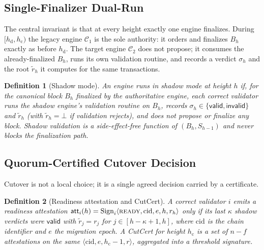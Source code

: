 \documentclass[journal]{IEEEtran}
\newtheorem{definition}{Definition}
\begin{document}
\subsection{Single-Finalizer Dual-Run}
The central invariant is that at every height exactly one engine finalizes. During
$[h_{\mathrm{d}}, h_{\mathrm{c}})$ the legacy engine $\mathcal{C}_1$ is the sole authority: it
orders and finalizes $B_h$ exactly as before $h_{\mathrm{d}}$. The target engine
$\mathcal{C}_2$ does not propose; it consumes the already-finalized $B_h$, runs its own
validation routine, and records a verdict $\sigma_h$ and the root $\tilde r_h$ it computes for
the same transactions.

\begin{definition}[Shadow mode]
\label{def:shadow}
An engine runs in shadow mode at height $h$ if, for the canonical block $B_h$ finalized by the
authoritative engine, each correct validator runs the shadow engine's validation routine on
$B_h$, records $\sigma_h \in \{\mathsf{valid},\mathsf{invalid}\}$ and $\tilde r_h$ (with
$\tilde r_h=\bot$ if validation rejects), and does not propose or finalize any block. Shadow
validation is a side-effect-free function of $(B_h,S_{h-1})$ and never blocks the finalization
path.
\end{definition}

\subsection{Quorum-Certified Cutover Decision}
Cutover is not a local choice; it is a single agreed decision carried by a certificate.

\begin{definition}[Readiness attestation and CutCert]
\label{def:cutcert}
A correct validator $i$ emits a readiness attestation $\mathsf{att}_i(h) = \mathrm{Sign}_i
\langle \textsc{ready}, \mathrm{cid}, e, h, r_h\rangle$ only if its last $\kappa$ shadow
verdicts were $\mathsf{valid}$ with $\tilde r_j = r_j$ for $j\in[h-\kappa+1,h]$, where
$\mathrm{cid}$ is the chain identifier and $e$ the migration epoch. A CutCert for height
$h_{\mathrm{c}}$ is a set of $n-f$ attestations on the same $\langle \mathrm{cid},e,h_{\mathrm{c}}-1,r\rangle$,
aggregated into a threshold signature.
\end{definition}
\end{document}
